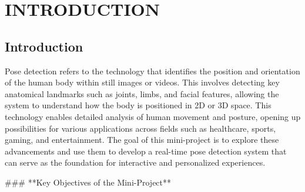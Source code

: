 \documentclass[a4paper,12pt]{report}
\begin{document}
\tableofcontents

\chapter{INTRODUCTION}
\section*{Introduction}
Pose detection refers to the technology that identifies the position and orientation of the human body within still images or videos. This involves detecting key anatomical landmarks such as joints, limbs, and facial features, allowing the system to understand how the body is positioned in 2D or 3D space. This technology enables detailed analysis of human movement and posture, opening up possibilities for various applications across fields such as healthcare, sports, gaming, and entertainment. The goal of this mini-project is to explore these advancements and use them to develop a real-time pose detection system that can serve as the foundation for interactive and personalized experiences.

### **Key Objectives of the Mini-Project**
\end{document}
